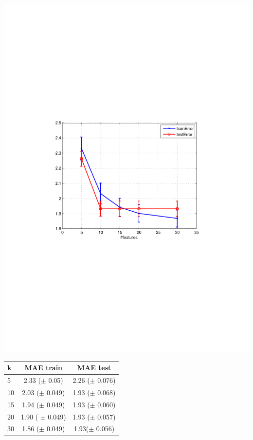 \begin{minipage}{\textwidth}
  \begin{minipage}[b]{0.45\textwidth}
    \centering
    \includegraphics[clip, trim=4cm 9.2cm 3.5cm 9cm, width=\textwidth]{figures/KNN_kvalue.pdf}
    \label{fig:KNN_kvalues}
  \end{minipage}
  \hfill
  \begin{minipage}[b]{0.5\textwidth}
  \begin{center}
  \begin{tabular}{ |l | c | c| }
    \hline
     k & MAE train & MAE test \\ \hline
     5   & 2.33 ($\pm$  0.05) &  2.26 ($\pm$  0.076) \\ \hline
     10  &  2.03 ($\pm$  0.049) &  1.93 ($\pm$  0.068) \\ \hline
     15     &  1.94 ($\pm$ 0.049)  & 1.93 ($\pm$ 0.060) \\ \hline
     20    & 1.90  ( $\pm$ 0.049) & 1.93 ($\pm$ 0.057)\\ \hline
     30     & 1.86 ($\pm$ 0.049) & 1.93($\pm$  0.056)\\ \hline
  \end{tabular}
  	\label{table:features_KNN_choice}
\end{center}
\vspace{10 mm}
    \end{minipage}
  \end{minipage}

